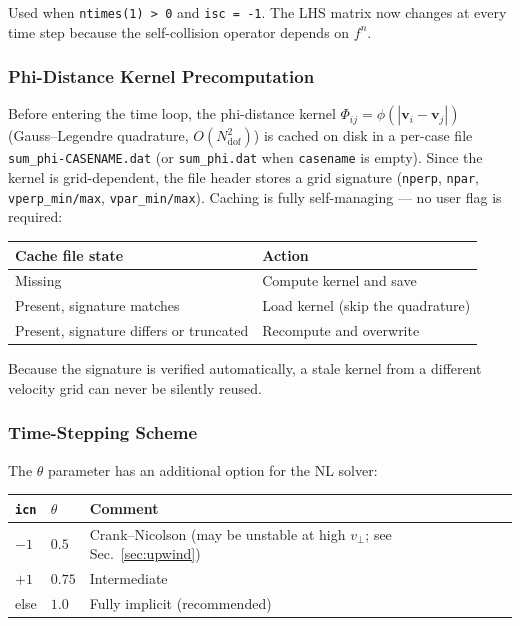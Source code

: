 \documentclass[11pt,a4paper]{article}
\newcommand{\vp}{v_\perp}
\begin{document}
Used when \texttt{ntimes(1) > 0} and \texttt{isc = -1}.  The LHS matrix now
changes at every time step because the self-collision operator depends on
$f^n$.

\subsubsection{Phi-Distance Kernel Precomputation}

Before entering the time loop, the phi-distance kernel
$\Phi_{ij} = \phi(|\bm{v}_i - \bm{v}_j|)$ (Gauss--Legendre quadrature,
$O(N_\mathrm{dof}^2)$) is cached on disk in a per-case file
\texttt{sum\_phi-CASENAME.dat} (or \texttt{sum\_phi.dat} when \texttt{casename}
is empty). Since the kernel is grid-dependent, the file header stores a grid
signature (\texttt{nperp}, \texttt{npar}, \texttt{vperp\_min/max},
\texttt{vpar\_min/max}). Caching is fully self-managing --- no user flag is
required:

\begin{center}
\begin{tabular}{ll}
\toprule
Cache file state & Action \\
\midrule
Missing                                  & Compute kernel and save \\
Present, signature matches               & Load kernel (skip the quadrature) \\
Present, signature differs or truncated  & Recompute and overwrite \\
\bottomrule
\end{tabular}
\end{center}

Because the signature is verified automatically, a stale kernel from a
different velocity grid can never be silently reused.

\subsubsection{Time-Stepping Scheme}
\label{sec:nl_theta}

The $\theta$ parameter has an additional option for the NL solver:

\begin{center}
\begin{tabular}{lll}
\toprule
\texttt{icn} & $\theta$ & Comment \\
\midrule
$-1$ & $0.5$ & Crank--Nicolson (may be unstable at high $\vp$; see Sec.~\ref{sec:upwind}) \\
$+1$ & $0.75$ & Intermediate \\
else & $1.0$ & Fully implicit (recommended) \\
\bottomrule
\end{tabular}
\end{center}
\end{document}
